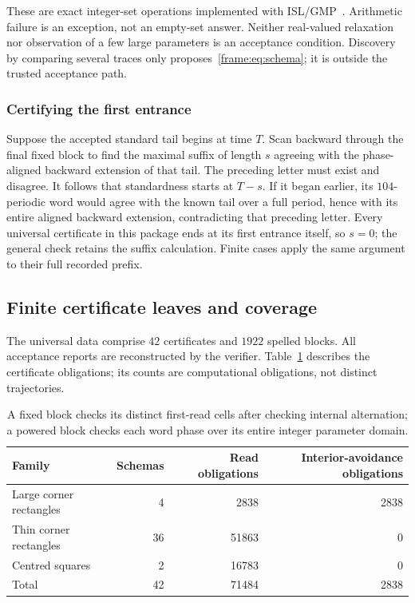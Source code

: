 These are exact integer-set operations implemented with ISL/GMP~\cite{islframes}. Arithmetic failure is an exception, not an empty-set answer. Neither real-valued relaxation nor observation of a few large parameters is an acceptance condition. Discovery by comparing several traces only proposes~\eqref{frame:eq:schema}; it is outside the trusted acceptance path.

\subsubsection{Certifying the first entrance}
Suppose the accepted standard tail begins at time $T$. Scan backward through the final fixed block to find the maximal suffix of length $s$ agreeing with the phase-aligned backward extension of that tail. The preceding letter must exist and disagree. It follows that standardness starts at $T-s$. If it began earlier, its $104$-periodic word would agree with the known tail over a full period, hence with its entire aligned backward extension, contradicting that preceding letter. Every universal certificate in this package ends at its first entrance itself, so $s=0$; the general check retains the suffix calculation. Finite cases apply the same argument to their full recorded prefix.

\subsection{Finite certificate leaves and coverage}
The universal data comprise $42$ certificates and $1922$ spelled blocks. All acceptance reports are reconstructed by the verifier. Table~\ref{frame:tab:checks} describes the certificate obligations; its counts are computational obligations, not distinct trajectories.
\begin{table}[ht]
\centering
\small\begin{tabular}{lrrr}
\toprule
Family & Schemas & Read obligations & Interior-avoidance obligations\\
\midrule
Large corner rectangles & 4 & 2838 & 2838\\
Thin corner rectangles & 36 & 51863 & 0\\
Centred squares & 2 & 16783 & 0\\
\midrule
Total & 42 & 71484 & 2838\\
\bottomrule
\end{tabular}
\caption{A fixed block checks its distinct first-read cells after checking internal alternation; a powered block checks each word phase over its entire integer parameter domain.}\label{frame:tab:checks}
\end{table}

